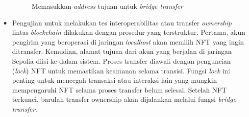 \begin{itemize}
    \begin{figure} [H] \centering
      \caption{Memasukkan \emph{address} tujuan untuk \emph{bridge transfer}}
      \label{fig:bridge_transfer}
      \end{figure}

    \item Pengujian untuk melakukan tes interoperabilitas atau transfer \emph{ownership} lintas \emph{blockchain} dilakukan dengan prosedur yang terstruktur. Pertama, akun pengirim yang beroperasi di jaringan \emph{localhost} akan memilih NFT yang ingin ditransfer. Kemudian, alamat tujuan dari akun yang berjalan di jaringan Sepolia diisi ke dalam sistem. Proses transfer diawali dengan penguncian (\emph{lock}) NFT untuk memastikan keamanan selama transisi. Fungsi \emph{lock} ini penting untuk mencegah transaksi atau interaksi lain yang mungkin mempengaruhi NFT selama proses transfer belum selesai. Setelah NFT terkunci, barulah transfer ownership akan dijalankan melalui fungsi \emph{bridge transfer}.
    

\end{itemize}
